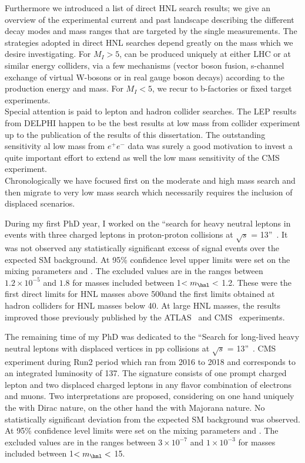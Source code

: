 Furthermore we introduced a list of direct HNL search results; we give an overview
of the experimental current and past landscape describing the different decay modes and
mass ranges that are targeted by the single measurements.
The strategies adopted in direct HNL searches depend greatly on the mass
which we desire investigating. For $M_{I} > 5$\GeV, \hnl can be
produced uniquely at either LHC or at similar energy colliders, via a few
mechanisms (vector boson fusion, s-channel exchange of virtual
W-bosons or in real gauge boson decays) according to the production
energy and \hnl mass. For $M_{I} < 5$\GeV, we recur to b-factories
or fixed target experiments. \\
Special attention is paid to lepton and hadron collider
searches. The LEP results from DELPHI happen to be the best results at
low mass from collider experiment up to the publication of the results
of this dissertation. The outstanding sensitivity al low mass from
$e^{+}e^{-}$ data was surely a good motivation to invest a quite
important effort to extend as well the low mass sensitivity of
the CMS experiment.\\

Chronologically we have focused first on the
moderate and high mass search and then migrate to very low mass search which
necessarily requires the inclusion of displaced scenarios.

During my first PhD year, I worked on the ``search for heavy neutral leptons in events with three charged
 leptons in proton-proton collisions at $\sqrt{s}$ =
 13\TeV''~\cite{Sirunyan:2018mtv}. It was not observed any
 statistically significant excess of signal events over the expected
SM background. At 95\% confidence level upper limits were set on the mixing
parameters \mixpare and \mixparm. The excluded values are in the
ranges between $1.2\times 10^{-5}$ and $1.8$ for masses included
between 1\GeV $< m_\hnl <$ 1.2\TeV. 
These were the first direct limits for HNL masses above 500\GeV and the first
limits obtained at hadron colliders for HNL masses below 40\GeV.
At large HNL masses, the results improved those previously published
by the ATLAS~\cite{Aad_2015} and CMS~\cite{Khachatryan_2015,Sirunyan:2018xiv}
experiments. 

The remaining time of my PhD was dedicated to the ``Search for long-lived heavy neutral leptons with displaced
vertices in pp collisions at $\sqrt{s}$ =
 13\TeV''~\cite{CMS-PAS-EXO-20-009}. CMS experiment during Run2 period
 which ran from 2016 to 2018 and corresponds to an integrated
luminosity of 137\fbinv.
The signature consists of one prompt charged lepton and two displaced
charged leptons in any flavor combination of electrons
and muons. Two interpretations are proposed, considering
on one hand uniquely the \hnl with 
Dirac nature, on the other hand the \hnl with Majorana nature. 
No statistically significant deviation from the expected
SM background was observed. At 95\% confidence level limits were set on the mixing
parameters \mixpare and \mixparm.
The excluded values are in the
ranges between $3\times 10^{-7}$ and $1\times 10^{-3}$ for masses included
between 1\GeV $< m_\hnl <$ 15\GeV. \\

